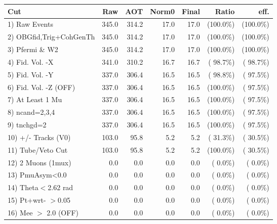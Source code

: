  \begin{table}[h!]\centering
 \begin{tabular}{||l||r|r|r|r|r|r||}
 \hline
 \hline
 Cut & Raw & AOT & Norm0 & Final & Ratio & eff.       \\
 \hline
  1) Raw Events           &        345.0 &        314.2 &         17.0 &         17.0 & (100.0\%) & (100.0\%) \\
  2) OBGfid,Trig+CohGenTh &        345.0 &        314.2 &         17.0 &         17.0 & (100.0\%) & (100.0\%) \\
  3) Pfermi \& W2         &        345.0 &        314.2 &         17.0 &         17.0 & (100.0\%) & (100.0\%) \\
  4) Fid. Vol. -X         &        341.0 &        310.2 &         16.7 &         16.7 & ( 98.7\%) & ( 98.7\%) \\
  5) Fid. Vol. -Y         &        337.0 &        306.4 &         16.5 &         16.5 & ( 98.8\%) & ( 97.5\%) \\
  6) Fid. Vol. -Z (OFF)   &        337.0 &        306.4 &         16.5 &         16.5 & (100.0\%) & ( 97.5\%) \\
  7) At Least 1 Mu        &        337.0 &        306.4 &         16.5 &         16.5 & (100.0\%) & ( 97.5\%) \\
  8) ncand=2,3,4          &        337.0 &        306.4 &         16.5 &         16.5 & (100.0\%) & ( 97.5\%) \\
  9) tnchgd=2             &        337.0 &        306.4 &         16.5 &         16.5 & (100.0\%) & ( 97.5\%) \\
 10) +/- Tracks (V0)      &        103.0 &         95.8 &          5.2 &          5.2 & ( 31.3\%) & ( 30.5\%) \\
 11) Tube/Veto Cut        &        103.0 &         95.8 &          5.2 &          5.2 & (100.0\%) & ( 30.5\%) \\
 12) 2 Muons (1mux)       &          0.0 &          0.0 &          0.0 &          0.0 & (  0.0\%) & (  0.0\%) \\
 13) PmuAsym<0.0          &          0.0 &          0.0 &          0.0 &          0.0 & (  0.0\%) & (  0.0\%) \\
 14) Theta$<$2.62 rad     &          0.0 &          0.0 &          0.0 &          0.0 & (  0.0\%) & (  0.0\%) \\
 15) Pt+wrt- $>$0.05      &          0.0 &          0.0 &          0.0 &          0.0 & (  0.0\%) & (  0.0\%) \\
 16) Mee $>$ 2.0  (OFF)   &          0.0 &          0.0 &          0.0 &          0.0 & (  0.0\%) & (  0.0\%) \\

\end{tabular}
\end{table}
